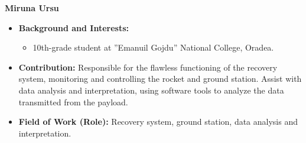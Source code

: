 \item[] \textbf{Miruna Ursu}
    \begin{itemize}[label=]
        \item[\faGraduationCap] \textbf{Background and Interests:} 
        \begin{itemize}[label=\textbullet]
            \item 10th-grade student at ”Emanuil Gojdu” National College, Oradea.
        \end{itemize}
        \item[\faEdit] \textbf{Contribution:} Responsible for the flawless functioning of the recovery system, monitoring and controlling the rocket and ground station. Assist with data analysis and interpretation, using software tools to analyze the data transmitted from the payload.
        \item[\faMicroscope] \textbf{Field of Work (Role):} Recovery system, ground station, data analysis and interpretation.
    \end{itemize}
    \vspace{0.2 cm}
    